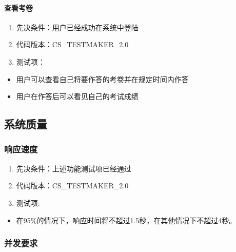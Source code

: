 \documentclass[hyperref, a4paper]{ctexart}
\providecommand{\tightlist}{%
  \setlength{\itemsep}{0pt}\setlength{\parskip}{0pt}}
\let\oldparagraph\paragraph
\renewcommand{\paragraph}[1]{\oldparagraph{#1}\mbox{}}
\begin{document}
\hypertarget{ux67e5ux770bux8003ux5377}{%
\paragraph{查看考卷}\label{ux67e5ux770bux8003ux5377}}

\begin{enumerate}
\def\labelenumi{\arabic{enumi}.}
\tightlist
\item
  先决条件：用户已经成功在系统中登陆
\item
  代码版本：CS\_TESTMAKER\_2.0
\item
  测试项：
\end{enumerate}

\begin{itemize}
\tightlist
\item
  用户可以查看自己将要作答的考卷并在规定时间内作答
\item
  用户在作答后可以看见自己的考试成绩
\end{itemize}

\hypertarget{ux7cfbux7edfux8d28ux91cf}{%
\subsection{系统质量}\label{ux7cfbux7edfux8d28ux91cf}}

\hypertarget{ux54cdux5e94ux901fux5ea6}{%
\subsubsection{响应速度}\label{ux54cdux5e94ux901fux5ea6}}

\begin{enumerate}
\def\labelenumi{\arabic{enumi}.}
\tightlist
\item
  先决条件：上述功能测试项已经通过
\item
  代码版本：CS\_TESTMAKER\_2.0
\item
  测试项:
\end{enumerate}

\begin{itemize}
\tightlist
\item
  在95\%的情况下，响应时间将不超过1.5秒，在其他情况下不超过4秒。
\end{itemize}

\hypertarget{ux5e76ux53d1ux8981ux6c42}{%
\subsubsection{并发要求}\label{ux5e76ux53d1ux8981ux6c42}}
\end{document}
